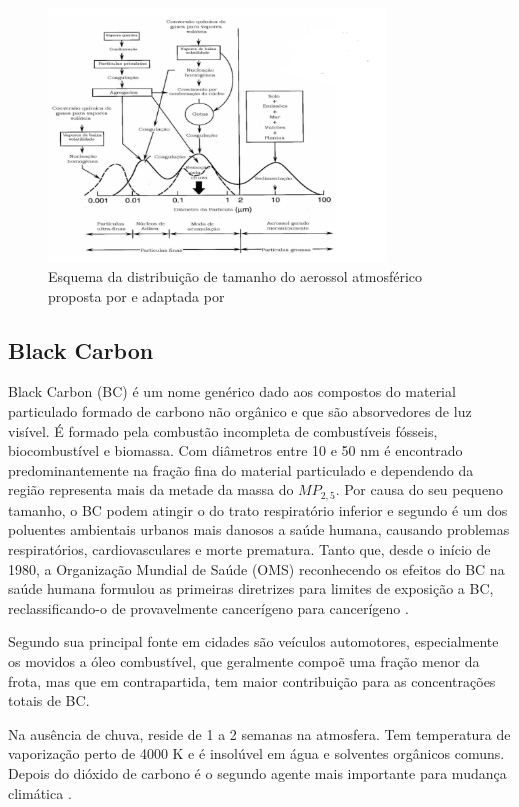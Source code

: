 \newpage
\begin{figure}[H]
  \centering
  \includegraphics[width=0.8\textwidth]{../inputs/images/modas_aerossol.png}
  \caption{Esquema da distribuição de tamanho do aerossol atmosférico proposta
           por \citet{finlayson1999} e adaptada por \citet{oliveira2007} 
           \label{fig:modas_aerossol}}
\end{figure}

\subsection{Black Carbon}

Black Carbon (BC) é um nome genérico dado aos compostos do material 
particulado formado de carbono não orgânico e que são absorvedores de luz
visível. É formado pela combustão incompleta de combustíveis fósseis, 
biocombustível e biomassa.
Com diâmetros entre 10 e 50 nm é encontrado predominantemente na fração fina 
do material particulado e dependendo da região representa mais da metade 
da massa do $MP_{2,5}$. Por causa do seu pequeno tamanho, o BC podem atingir o
do trato respiratório inferior e segundo \citet{jacobson2014} é um dos poluentes
ambientais urbanos mais danosos a saúde humana, causando problemas respiratórios, 
cardiovasculares e morte prematura. Tanto que, desde o início de 1980, 
a Organização Mundial de Saúde (OMS) reconhecendo os efeitos do BC na saúde 
humana formulou as primeiras diretrizes para limites de exposição a BC, 
reclassificando-o de provavelmente cancerígeno para cancerígeno
\citep{scovronick2015}.

Segundo \cite{petzold2013} sua principal fonte em cidades são veículos 
automotores, especialmente os movidos a óleo combustível, que geralmente 
compoẽ uma fração menor da frota, mas que em contrapartida, tem maior 
contribuição para as concentrações totais de BC. 

Na ausência de chuva, reside de 1 a 2 semanas na atmosfera. 
Tem temperatura de vaporização perto de 4000 K e é insolúvel em água e 
solventes orgânicos comuns. Depois do dióxido de carbono é o segundo 
agente mais importante para mudança climática \citep{bond2013}.

